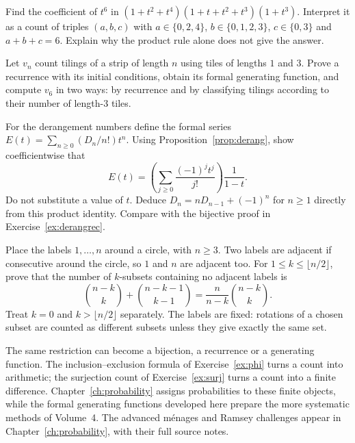 \begin{exercise}[$\star$]\label{ex:count-coefficient}
Find the coefficient of $t^6$ in $(1+t^2+t^4)(1+t+t^2+t^3)(1+t^3)$. Interpret it as a count of triples $(a,b,c)$ with $a\in\{0,2,4\}$, $b\in\{0,1,2,3\}$, $c\in\{0,3\}$ and $a+b+c=6$. Explain why the product rule alone does not give the answer.
\end{exercise}

\begin{exercise}[$\star\star$]\label{ex:count-tiles}
Let $v_n$ count tilings of a strip of length $n$ using tiles of lengths $1$ and $3$. Prove a recurrence with its initial conditions, obtain its formal generating function, and compute $v_6$ in two ways: by recurrence and by classifying tilings according to their number of length-$3$ tiles.
\end{exercise}

\begin{exercise}[$\star\star$]\label{ex:count-derang-gf}
For the derangement numbers define the formal series $E(t)=\sum_{n\ge0}(D_n/n!)t^n$. Using Proposition~\ref{prop:derang}, show coefficientwise that
\[
E(t)=\left(\sum_{j\ge0}\frac{(-1)^jt^j}{j!}\right)\frac1{1-t}.
\]
Do not substitute a value of $t$. Deduce $D_n=nD_{n-1}+(-1)^n$ for $n\ge1$ directly from this product identity. Compare with the bijective proof in Exercise~\ref{ex:derangrec}.
\end{exercise}

\begin{exercise}[$\star\star\star$]\label{ex:count-circle}
Place the labels $1,\dots,n$ around a circle, with $n\ge3$. Two labels are adjacent if consecutive around the circle, so $1$ and $n$ are adjacent too. For $1\le k\le\lfloor n/2\rfloor$, prove that the number of $k$-subsets containing no adjacent labels is
\[
\binom{n-k}{k}+\binom{n-k-1}{k-1}
=\frac{n}{n-k}\binom{n-k}{k}.
\]
Treat $k=0$ and $k>\lfloor n/2\rfloor$ separately. The labels are fixed: rotations of a chosen subset are counted as different subsets unless they give exactly the same set.
\end{exercise}

\begin{beauty}
The same restriction can become a bijection, a recurrence or a generating function. The inclusion--exclusion formula of Exercise~\ref{ex:phi} turns a count into arithmetic; the surjection count of Exercise~\ref{ex:surj} turns a count into a finite difference. Chapter~\ref{ch:probability} assigns probabilities to these finite objects, while the formal generating functions developed here prepare the more systematic methods of Volume~4. The advanced m\'enages and Ramsey challenges appear in Chapter~\ref{ch:probability}, with their full source notes.
\end{beauty}

